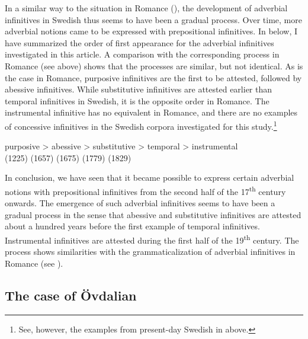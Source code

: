\documentclass[output=paper]{langscibook}
\begin{document}
In a similar way to the situation in Romance (\citealt{Schulte2007Prepositional,Schulte2007What}), the development of adverbial infinitives in Swedish thus seems to have been a gradual process. Over time, more adverbial notions came to be expressed with prepositional infinitives. In  below, I have summarized the order of first appearance for the adverbial infinitives investigated in this article. A comparison with the corresponding process in Romance (see  above) shows that the processes are similar, but not identical. As is the case in Romance, purposive infinitives are the first to be attested, followed by abessive infinitives. While substitutive infinitives are attested earlier than temporal infinitives in Swedish, it is the opposite order in Romance. The instrumental infinitive has no equivalent in Romance, and there are no examples of concessive infinitives in the Swedish corpora investigated for this study.\footnote{See, however, the examples from present-day Swedish in  above.}     

\ea  \label{ex:kalm:14}
\gll purposive >  abessive  > substitutive > temporal > instrumental\\
(1225) {} (1657) {} (1675) {} (1779) {} (1829)\\
\z 



In conclusion, we have seen that it became possible to express certain adverbial notions with prepositional infinitives from the second half of the 17\textsuperscript{th} century onwards. The emergence of such adverbial infinitives seems to have been a gradual process in the sense that abessive and substitutive infinitives are attested about a hundred years before the first example of temporal infinitives. Instrumental infinitives are attested during the first half of the 19\textsuperscript{th} century. The process shows similarities with the grammaticalization of adverbial infinitives in Romance (see \citealt{Schulte2007Prepositional,Schulte2007What}). 


\subsection{The case of Övdalian}\label{sec:kalm:4.3}
\end{document}

